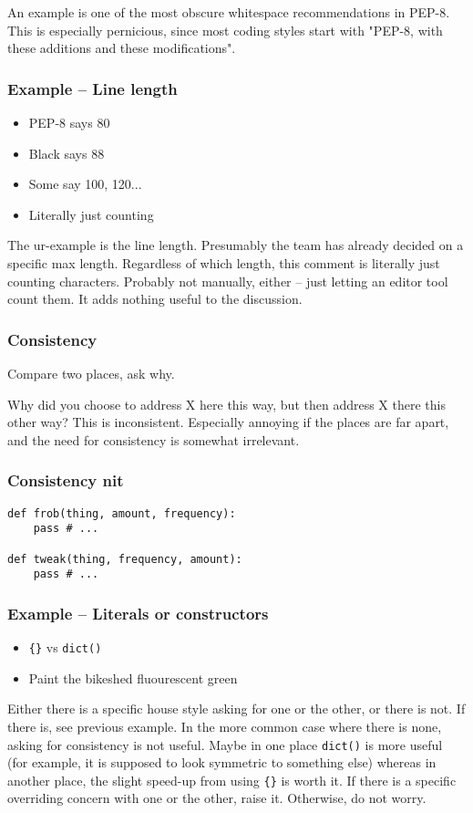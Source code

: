 An example is one of the most obscure whitespace recommendations in PEP-8.
This is especially pernicious,
since most coding styles start with "PEP-8, with these additions
and these modifications".


\begin{frame}
\frametitle{Example -- Line length}
\begin{itemize}
\item PEP-8 says 80
\item Black says 88
\item Some say 100, 120...
\item Literally just counting
\end{itemize}
\end{frame}

The ur-example is the line length.
Presumably the team has already decided on a specific max length.
Regardless of which length,
this comment is literally just counting characters.
Probably not manually, either --
just letting an editor tool count them.
It adds nothing useful to the discussion.

\begin{frame}
\frametitle{Consistency}
Compare two places,
ask why.
\end{frame}

Why did you choose to address X here this way,
but then address X there this other way?
This is inconsistent.
Especially annoying if the places are far apart,
and the need for consistency is somewhat irrelevant.

\begin{frame}[fragile]
\frametitle{Consistency nit}

\begin{lstlisting}
def frob(thing, amount, frequency):
    pass # ...

def tweak(thing, frequency, amount):
    pass # ...
\end{lstlisting}
\end{frame}

\begin{frame}[fragile]
\frametitle{Example -- Literals or constructors}
\begin{itemize}
\item \verb|{}| vs \verb|dict()|
\item Paint the bikeshed fluourescent green
\end{itemize}
\end{frame}

Either there is a specific house style asking for one or the other,
or there is not.
If there is, see previous example.
In the more common case where there is none,
asking for consistency is not useful.
Maybe in one place \verb|dict()| is more useful
(for example, it is supposed to look symmetric to something else)
whereas in another place,
the slight speed-up from using \verb|{}| is worth it.
If there is a specific overriding concern with one or the other,
raise it.
Otherwise, do not worry.

